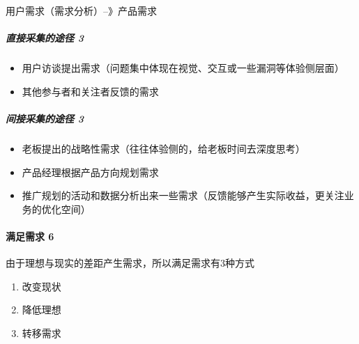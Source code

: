 \documentclass[letterpaper,10pt,english]{sphinxmanual}
\begin{document}
用户需求\sphinxhyphen{}（需求分析）–》产品需求


\subparagraph{直接采集的途径 3\sphinxfootnotemark[31]}
\label{\detokenize{chapter_introduction/need:id7}}%
\begin{footnotetext}[31]\sphinxAtStartFootnote
{}
%
\end{footnotetext}\ignorespaces \begin{itemize}
\item {} 
用户访谈提出需求（问题集中体现在视觉、交互或一些漏洞等体验侧层面）

\item {} 
其他参与者和关注者反馈的需求

\end{itemize}


\subparagraph{间接采集的途径 3\sphinxfootnotemark[32]}
\label{\detokenize{chapter_introduction/need:id8}}%
\begin{footnotetext}[32]\sphinxAtStartFootnote
{}
%
\end{footnotetext}\ignorespaces \begin{itemize}
\item {} 
老板提出的战略性需求（往往体验侧的，给老板时间去深度思考）

\item {} 
产品经理根据产品方向规划需求

\item {} 
推广规划的活动和数据分析出来一些需求（反馈能够产生实际收益，更关注业务的优化空间）

\end{itemize}


\paragraph{满足需求 6\sphinxfootnotemark[33]}
\label{\detokenize{chapter_introduction/need:id9}}%
\begin{footnotetext}[33]\sphinxAtStartFootnote
{}
%
\end{footnotetext}\ignorespaces 
由于理想与现实的差距产生需求，所以满足需求有3种方式
\begin{enumerate}
%
\item {} 
改变现状

\item {} 
降低理想

\item {} 
转移需求

\end{enumerate}
\end{document}
